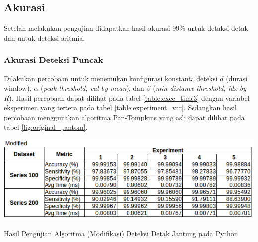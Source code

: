 

\subsection{Akurasi}
Setelah melakukan pengujian didapatkan hasil akurasi 99\% untuk detaksi detak dan \accuracy untuk deteksi aritmia.
\subsubsection{Akurasi Deteksi Puncak}
Dilakukan percobaan untuk menemukan konfigurasi konstanta deteksi $d$ (durasi window), $\alpha$ (\textit{peak threshold, val by mean}), dan $\beta$ (\textit{min distance threshold, idx by R}). Hasil percobaan dapat dilihat pada tabel \ref{table:exec_time3} dengan variabel eksperimen yang tertera pada tabel \ref{table:experiment_var}. Sedangkan hasil percobaan menggunakan algoritma Pan-Tompkins yang asli dapat dilihat pada tabel \ref{fig:original_pantom}.

\begin{table}[H]
	\centering
	\includegraphics[scale=0.8]{images/modif_beat_detect.png}	
	\caption{Hasil Pengujian Algoritma (Modifikasi) Deteksi Detak Jantung pada Python}
	\label{table:exec_time3}
\end{table}

